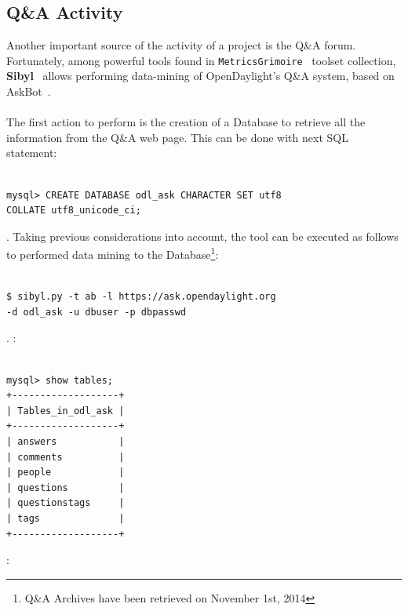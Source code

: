 \documentclass[a4paper, 12pt]{book}
\begin{document}
{\subsection{Q\&A Activity}
Another important source of the activity of a project is the Q\&A forum. Fortunately, among powerful tools found in \texttt{MetricsGrimoire}~\cite{MetricsGrimoire} toolset collection, \textbf{Sibyl}~\cite{Sibyl} allows performing data-mining of OpenDaylight's Q\&A system, based on AskBot~\cite{AskBot}.\\
\\
The first action to perform is the creation of a Database to retrieve all the information from the Q\&A web page. This can be done with next SQL statement:

\begin{verbatim}

mysql> CREATE DATABASE odl_ask CHARACTER SET utf8
COLLATE utf8_unicode_ci;

\end{verbatim}
. Taking previous considerations into account, the tool can be executed as follows to performed data mining to the Database\footnote{Q\&A Archives have been retrieved on November 1st, 2014}:

\begin{verbatim}

$ sibyl.py -t ab -l https://ask.opendaylight.org
-d odl_ask -u dbuser -p dbpasswd

\end{verbatim}

.
:

\begin{verbatim}

mysql> show tables;
+-------------------+
| Tables_in_odl_ask |
+-------------------+
| answers           |
| comments          |
| people            |
| questions         |
| questionstags     |
| tags              |
+-------------------+

\end{verbatim}
:

}
\end{document}
